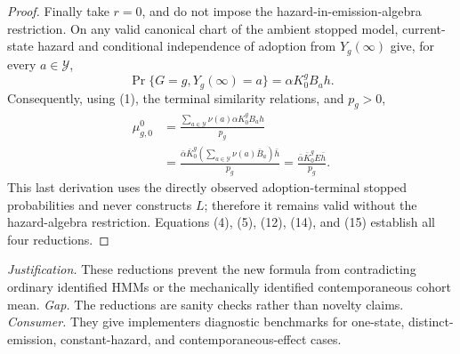 \documentclass{article}
\begin{document}
\begin{proof}
Finally take \(r=0\), and do not impose the hazard-in-emission-algebra restriction.  On any valid canonical chart of the ambient stopped model, current-state hazard and conditional independence of adoption from \(Y_g(\infty)\) give, for every \(a\in\mathcal Y\),
\[
 \Pr\{G=g,Y_g(\infty)=a\}=\alpha K_0^gB_ah.
\]
Consequently, using (1), the terminal similarity relations, and \(p_g>0\),
\[
 \begin{aligned}
 \mu^0_{g,0}
 &=\frac{\sum_{a\in\mathcal Y}\nu(a)\alpha K_0^gB_ah}{p_g}\\
 &=\frac{\bar\alpha\bar K_0^g
 \left(\sum_{a\in\mathcal Y}\nu(a)\bar B_a\right)\bar h}{p_g}
 =\frac{\bar\alpha\bar K_0^gE\bar h}{p_g}.
 \end{aligned}                                                                  \tag{15}
\]
This last derivation uses the directly observed adoption-terminal stopped probabilities and never constructs \(L\); therefore it remains valid without the hazard-algebra restriction.  Equations (4), (5), (12), (14), and (15) establish all four reductions.
\end{proof}
\par\smallskip\noindent \textit{Justification.} These reductions prevent the new formula from contradicting ordinary identified HMMs or the mechanically identified contemporaneous cohort mean. \textit{Gap.} The reductions are sanity checks rather than novelty claims. \textit{Consumer.} They give implementers diagnostic benchmarks for one-state, distinct-emission, constant-hazard, and contemporaneous-effect cases.
\end{document}
